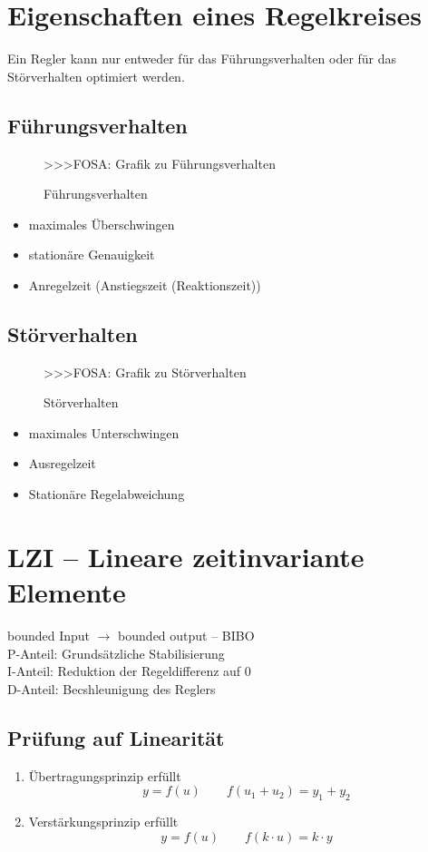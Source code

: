 \section{Eigenschaften eines Regelkreises}
Ein Regler kann nur entweder für das Führungsverhalten oder für das 
Störverhalten optimiert werden. 

\subsection{Führungsverhalten}
\begin{figure}[h!]
    \centering
    >>>FOSA: Grafik zu Führungsverhalten
    \caption{Führungsverhalten}
    \label{fig:fhr}
\end{figure}
\begin{itemize}
  \item maximales Überschwingen
  \item stationäre Genauigkeit
  \item Anregelzeit (Anstiegszeit (Reaktionszeit))
\end{itemize}

\subsection{Störverhalten}
\begin{figure}[h!]
    \centering
    >>>FOSA: Grafik zu Störverhalten
    \caption{Störverhalten}
    \label{fig:str}
\end{figure}
\begin{itemize}
  \item maximales Unterschwingen
  \item Ausregelzeit
  \item Stationäre Regelabweichung
\end{itemize}

\section{LZI -- Lineare zeitinvariante Elemente}
bounded Input $\rightarrow$ bounded output -- BIBO\\
P-Anteil: Grundsätzliche Stabilisierung \\
I-Anteil: Reduktion der Regeldifferenz auf 0 \\
D-Anteil: Becshleunigung des Reglers

\subsection{Prüfung auf Linearität}
\begin{enumerate}
  \item Übertragungsprinzip erfüllt 
        \[ y = f(u) \qquad f(u_1 + u_2) = y_1 + y_2 \]
  \item Verstärkungsprinzip erfüllt
        \[ y = f(u) \qquad f(k \cdot u) = k \cdot y \]
\end{enumerate}

\[ \boxed{} \]
\[ \boxed{} \]